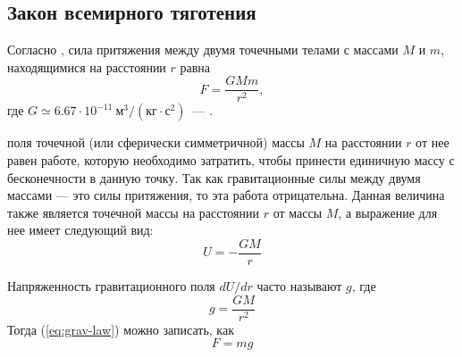 \subsection{Закон всемирного тяготения}
Согласно , сила притяжения 
между двумя точечными телами с массами $M$ и $m$,
находящимися на расстоянии $r$ равна
\begin{equation}
	F=\frac{GMm}{r^2}, \label{eq:grav-law}
\end{equation}\nopagebreak где $G\simeq 6.67\cdot 10^{-11}~\text{м}^3 / 
\left( \text{кг} \cdot \text{с}^2 \right)$~--- 
.

 поля точечной (или сферически 
симметричной) массы $M$ на расстоянии $r$ от нее равен
работе, которую необходимо затратить, чтобы принести
единичную массу с бесконечности в данную точку. Так как
гравитационные силы между двумя массами --- это силы 
притяжения, то эта работа отрицательна. Данная
величина также является  точечной
массы на расстоянии $r$ от массы $M$, а выражение для нее имеет 
следующий вид:\begin{equation}
U=-\frac{GM}{r}
\end{equation}

Напряженность гравитационного поля $dU/dr$ часто называют 
 $g$, где
\begin{equation}
	g = \frac{GM}{r^2}
	\label{eq:g}
\end{equation}
Тогда (\ref{eq:grav-law}) можно записать, как \begin{equation}
	F = mg
\end{equation}
